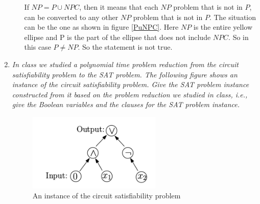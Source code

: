\documentclass[paper=a4, fontsize=11pt]{scrartcl} %
\numberwithin{equation}{section} %
\numberwithin{figure}{section} %
\numberwithin{table}{section} %
\begin{document}
\begin{enumerate}
\begin{enumerate}
If $NP=P \cup NPC$, then it means that each $NP$ problem that is not in $P$, can be converted to any other $NP$ problem that is not in $P$. The situation can be the one as shown in figure \ref{PuNPC}. Here $NP$ is the entire yellow ellipse and P is the part of the ellipse that does not include $NPC$. So in this case $P \neq NP$. So the statement is not true.
    
  \end{enumerate}
  
  \item \textit{In class we studied a polynomial time problem reduction from the circuit satisfiability problem to the SAT problem. The following figure shows an instance of the circuit satisfiability problem. Give the SAT problem instance constructed from it based on the problem reduction we studied in class, i.e., give the Boolean variables and the clauses for the SAT problem instance.}

  
	\begin{figure}[!h]
		\centering
		\includegraphics[width=2.5in]{CSAT.png}
		\caption{An instance of the circuit satisfiability problem}
		\label{CSAT}
	\end{figure}  






\end{enumerate}


\end{document}
